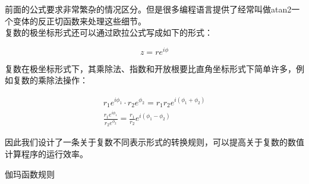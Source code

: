 \begin{itemize}
  前面的公式要求非常繁杂的情况区分。但是很多编程语言提供了经常叫做atan2一个变体的反正切函数来处理这些细节。\\

  复数的极坐标形式还可以通过欧拉公式写成如下的形式：

  \begin{equation*}
    z = r e^{i\phi}
  \end{equation*}

  复数在极坐标形式下，其乘除法、指数和开放根要比直角坐标形式下简单许多，例如复数的乘除法操作：

  \begin{gather*}
    r_1 e^{i\phi_1} \cdot r_2 e^{\phi_2} = r_1r_2 e^{i(\phi_1+\phi_2)} \\
    \frac{r_1 e^{i\phi_1}}{r_2 e^{\phi_2}} = \frac{r_1}{r_2}e^{i(\phi_1-\phi_2)}
  \end{gather*}

  因此我们设计了一条关于复数不同表示形式的转换规则，可以提高关于复数的数值计算程序的运行效率。

\end{itemize}

\vspace{1mm}
\begin{center}
{\kaishu{} 伽玛函数规则}
\end{center}
\vspace{1mm}

